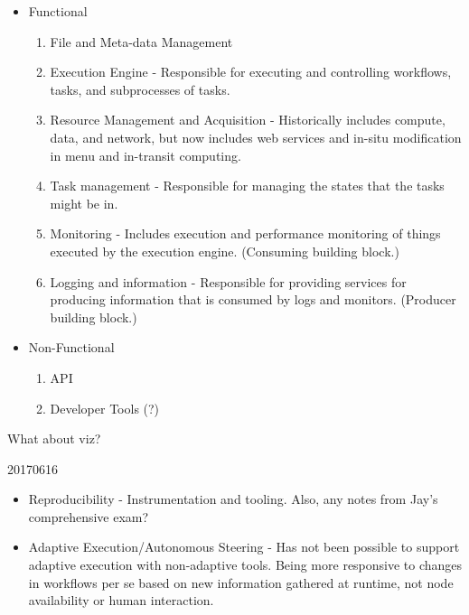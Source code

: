 \begin{itemize}
\item Functional
\begin{enumerate}
\item File and Meta-data Management
\item Execution Engine - Responsible for executing and controlling workflows, tasks, and subprocesses of tasks.
\item Resource Management and Acquisition - Historically includes compute, data, and network, but now includes web services and in-situ modification in menu and in-transit computing.
\item Task management - Responsible for managing the states that the tasks might be in.
\item Monitoring - Includes execution and performance monitoring of things executed by the execution engine. (Consuming building block.)
\item Logging and information - Responsible for providing services for producing information that is consumed by logs and monitors. (Producer building block.)
\end{enumerate}
\item Non-Functional
\begin{enumerate}
\item API 
\item Developer Tools (?)
\end{enumerate}
\end{itemize}

What about viz?

20170616

\begin{itemize}
    \item Reproducibility - Instrumentation and tooling. Also, any notes from Jay's comprehensive exam?
    \item Adaptive Execution/Autonomous Steering - Has not been possible to support adaptive execution with non-adaptive tools. Being more responsive to changes in workflows per se based on new information gathered at runtime, not node availability or human interaction.
\end{itemize}

